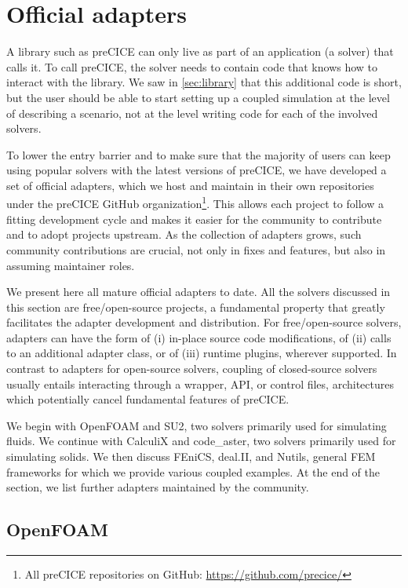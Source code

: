 \section{Official adapters}
\label{sec:adapters}

A library such as preCICE can only live as part of an application (a solver) that calls it.
To call preCICE, the solver needs to contain code that knows how to interact with the library.
We saw in \autoref{sec:library} that this additional code is short, but the user should be able to start setting up
a coupled simulation at the level of describing a scenario, not at the level writing code for each of the involved solvers. 

To lower the entry barrier and to make sure that the majority of users can keep using popular solvers
with the latest versions of preCICE, we have developed a set of official adapters, which we host and maintain in their
own repositories under the preCICE GitHub organization\footnote{All preCICE repositories on GitHub: \url{https://github.com/precice/}}.
This allows each project to follow a fitting development cycle and makes it easier for the community to contribute and to adopt projects upstream.
As the collection of adapters grows, such community contributions
are crucial, not only in fixes and features, but also in assuming maintainer roles.

We present here all mature official adapters to date. All the solvers discussed in this section are free/open-source projects,
a fundamental property that greatly facilitates the adapter development and distribution.
For free/open-source solvers, adapters can have the form of (i) in-place source code modifications, of (ii) calls to an additional adapter class,
or of (iii) runtime plugins, wherever supported. In contrast to adapters for open-source solvers, coupling of closed-source solvers usually entails
interacting through a wrapper, API, or control files, architectures which potentially cancel fundamental features of preCICE.

We begin with OpenFOAM and SU2, two solvers primarily used for simulating fluids.
We continue with CalculiX and code\_aster, two solvers primarily used for simulating solids.
We then discuss FEniCS, deal.II, and Nutils, general FEM frameworks for which we provide various coupled examples.
At the end of the section, we list further adapters maintained by the community.
  
\subsection{OpenFOAM}

